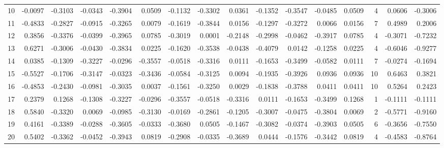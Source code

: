 \begin{tabular}{lrrrrrrrrrrrrrrr}
10  &     -0.0097 & -0.3103 & -0.0343 & -0.3904 &  0.0509 & -0.1132 & -0.3302 &  0.0361 & -0.1352 & -0.3547 &  -0.0485 &     0.0509 &      4 &                    0.0606 &                    -0.3006 \\
11  &     -0.4833 & -0.2827 & -0.0915 & -0.3265 &  0.0079 & -0.1619 & -0.3844 &  0.0156 & -0.1297 & -0.3272 &   0.0066 &     0.0156 &      7 &                    0.4989 &                     0.2006 \\
12  &      0.3856 & -0.3376 & -0.0399 & -0.3965 &  0.0785 & -0.3019 &  0.0001 & -0.2148 & -0.2998 & -0.0462 &  -0.3917 &     0.0785 &      4 &                   -0.3071 &                    -0.7232 \\
13  &      0.6271 & -0.3006 & -0.0430 & -0.3834 &  0.0225 & -0.1620 & -0.3538 & -0.0438 & -0.4079 &  0.0142 &  -0.1258 &     0.0225 &      4 &                   -0.6046 &                    -0.9277 \\
14  &      0.0385 & -0.1309 & -0.3227 & -0.0296 & -0.3557 & -0.0518 & -0.3316 &  0.0111 & -0.1653 & -0.3499 &  -0.0582 &     0.0111 &      7 &                   -0.0274 &                    -0.1694 \\
15  &     -0.5527 & -0.1706 & -0.3147 & -0.0323 & -0.3436 & -0.0584 & -0.3125 &  0.0094 & -0.1935 & -0.3926 &   0.0936 &     0.0936 &     10 &                    0.6463 &                     0.3821 \\
16  &     -0.4853 & -0.2430 & -0.0981 & -0.3035 &  0.0037 & -0.1561 & -0.3250 &  0.0029 & -0.1838 & -0.3788 &   0.0411 &     0.0411 &     10 &                    0.5264 &                     0.2423 \\
17  &      0.2379 &  0.1268 & -0.1308 & -0.3227 & -0.0296 & -0.3557 & -0.0518 & -0.3316 &  0.0111 & -0.1653 &  -0.3499 &     0.1268 &      1 &                   -0.1111 &                    -0.1111 \\
18  &      0.5840 & -0.3320 &  0.0069 & -0.0985 & -0.3130 & -0.0169 & -0.2861 & -0.1205 & -0.3007 & -0.0475 &  -0.3804 &     0.0069 &      2 &                   -0.5771 &                    -0.9160 \\
19  &      0.4161 & -0.3389 & -0.0288 & -0.3605 & -0.0333 & -0.3680 &  0.0505 & -0.1467 & -0.3082 & -0.0374 &  -0.3903 &     0.0505 &      6 &                   -0.3656 &                    -0.7550 \\
20  &      0.5402 & -0.3362 & -0.0452 & -0.3943 &  0.0819 & -0.2908 & -0.0335 & -0.3689 &  0.0444 & -0.1576 &  -0.3442 &     0.0819 &      4 &                   -0.4583 &                    -0.8764 \\

\end{tabular}
